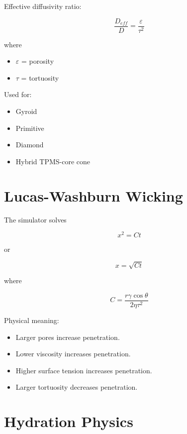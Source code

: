 \documentclass[11pt]{article}
\begin{document}
Effective diffusivity ratio:

\begin{equation}
\frac{D_{eff}}{D}
=
\frac{\varepsilon}{\tau^2}
\end{equation}

where

\begin{itemize}
\item $\varepsilon$ = porosity
\item $\tau$ = tortuosity
\end{itemize}

Used for:

\begin{itemize}
\item Gyroid
\item Primitive
\item Diamond
\item Hybrid TPMS-core cone
\end{itemize}

\section{Lucas-Washburn Wicking}

The simulator solves

\begin{equation}
x^2=Ct
\end{equation}

or

\begin{equation}
x=\sqrt{Ct}
\end{equation}

where

\begin{equation}
C
=
\frac{r\gamma \cos\theta}
{2\eta\tau^2}
\end{equation}

Physical meaning:

\begin{itemize}
\item Larger pores increase penetration.
\item Lower viscosity increases penetration.
\item Higher surface tension increases penetration.
\item Larger tortuosity decreases penetration.
\end{itemize}

\section{Hydration Physics}
\end{document}
